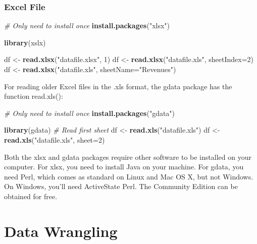 \documentclass[
]{book}
\newenvironment{Shaded}{\begin{snugshade}}{\end{snugshade}}
\newcommand{\CommentTok}[1]{\textcolor[rgb]{0.56,0.35,0.01}{\textit{#1}}}
\newcommand{\DataTypeTok}[1]{\textcolor[rgb]{0.13,0.29,0.53}{#1}}
\newcommand{\DecValTok}[1]{\textcolor[rgb]{0.00,0.00,0.81}{#1}}
\newcommand{\KeywordTok}[1]{\textcolor[rgb]{0.13,0.29,0.53}{\textbf{#1}}}
\newcommand{\NormalTok}[1]{#1}
\newcommand{\StringTok}[1]{\textcolor[rgb]{0.31,0.60,0.02}{#1}}
\begin{document}
\hypertarget{excel-file}{%
\subsection{Excel File}\label{excel-file}}

\begin{Shaded}
\begin{Highlighting}[]
\CommentTok{# Only need to install once}
\KeywordTok{install.packages}\NormalTok{(}\StringTok{"xlsx"}\NormalTok{)}

\KeywordTok{library}\NormalTok{(xslx)}

\NormalTok{df <-}\StringTok{ }\KeywordTok{read.xlsx}\NormalTok{(}\StringTok{"datafile.xlsx"}\NormalTok{, }\DecValTok{1}\NormalTok{)}
\NormalTok{df <-}\StringTok{ }\KeywordTok{read.xlsx}\NormalTok{(}\StringTok{"datafile.xls"}\NormalTok{, }\DataTypeTok{sheetIndex=}\DecValTok{2}\NormalTok{)}
\NormalTok{df <-}\StringTok{ }\KeywordTok{read.xlsx}\NormalTok{(}\StringTok{"datafile.xls"}\NormalTok{, }\DataTypeTok{sheetName=}\StringTok{"Revenues"}\NormalTok{)}
\end{Highlighting}
\end{Shaded}

For reading older Excel files in the .xls format, the gdata package has the function read.xls():

\begin{Shaded}
\begin{Highlighting}[]
\CommentTok{# Only need to install once}
\KeywordTok{install.packages}\NormalTok{(}\StringTok{"gdata"}\NormalTok{)}

\KeywordTok{library}\NormalTok{(gdata)}
\CommentTok{# Read first sheet}
\NormalTok{df <-}\StringTok{ }\KeywordTok{read.xls}\NormalTok{(}\StringTok{"datafile.xls"}\NormalTok{)}
\NormalTok{df <-}\StringTok{ }\KeywordTok{read.xls}\NormalTok{(}\StringTok{"datafile.xls"}\NormalTok{, }\DataTypeTok{sheet=}\DecValTok{2}\NormalTok{)}
\end{Highlighting}
\end{Shaded}

Both the xlsx and gdata packages require other software to be installed on your computer. For xlsx, you need to install Java on your machine. For gdata, you need Perl, which comes as standard on Linux and Mac OS X, but not Windows. On Windows, you'll need ActiveState Perl. The Community Edition can be obtained for free.

\hypertarget{data-wrangling}{%
\chapter{Data Wrangling}\label{data-wrangling}}
\end{document}
